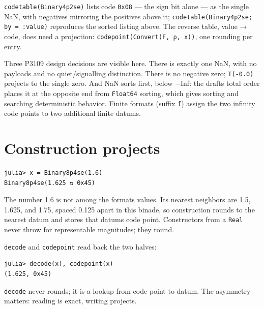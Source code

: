 \texttt{codetable(Binary4p2se)} lists code \texttt{0x08} — the sign bit alone — as the single NaN, with negatives mirroring the positives above it; \texttt{codetable(Binary4p2se; by = :value)} reproduces the sorted listing above. The reverse table, value → code, does need a projection: \texttt{codepoint(Convert(F, ρ, x))}, one rounding per entry.



Three P3109 design decisions are visible here. There is exactly one NaN, with no payloads and no quiet/signalling distinction. There is no negative zero; \texttt{T(-0.0)} projects to the single zero. And NaN sorts first, below −Inf: the draft{\textquotesingle}s total order places it at the opposite end from \texttt{Float64} sorting, which gives sorting and searching deterministic behavior. Finite formats (suffix \texttt{f}) assign the two infinity code points to two additional finite datums.



\section{Construction projects}



\label{8317558927995832252}{}



\begin{verbatim}
julia> x = Binary8p4se(1.6)
Binary8p4se(1.625 ⇆ 0x45)
\end{verbatim}



The number 1.6 is not among the format{\textquotesingle}s values. Its nearest neighbors are 1.5, 1.625, and 1.75, spaced 0.125 apart in this binade, so construction rounds to the nearest datum and stores that datum{\textquotesingle}s code point. Constructors from a \texttt{Real} never throw for representable magnitudes; they round.



\texttt{decode} and \texttt{codepoint} read back the two halves:




\begin{verbatim}
julia> decode(x), codepoint(x)
(1.625, 0x45)
\end{verbatim}



\texttt{decode} never rounds; it is a lookup from code point to datum. The asymmetry matters: reading is exact, writing projects.



